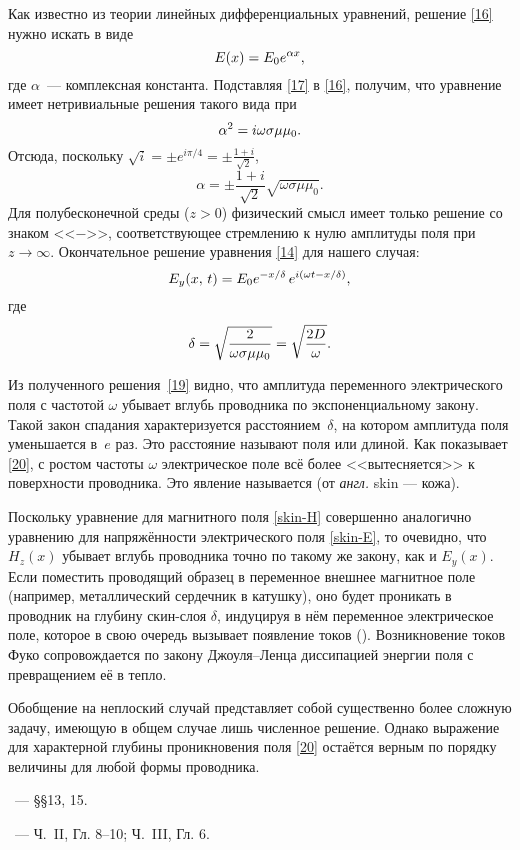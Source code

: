 Как известно из теории линейных дифференциальных уравнений, решение
\eqref{16} нужно искать в виде 
\begin{equation} \eqmark{17}
E(x)=E_0 e^{\alpha x},
\end{equation}
где $\alpha$~--- комплексная константа. 
Подставляя \eqref{17} в \eqref{16}, получим, что уравнение имеет
нетривиальные решения такого вида при
\begin{equation} \eqmark{18}
\alpha^2=i\omega\sigma\mu\mu_0.
\end{equation}
Отсюда, поскольку $\sqrt{i} = \pm e^{i\pi/4}  = \pm \frac{1+i}{\sqrt{2}}$,
\begin{equation*}
\alpha=\pm\frac{1+i}{\sqrt{2}}\sqrt{\omega\sigma\mu\mu_0}.
\end{equation*}
Для полубесконечной среды ($z>0$) физический смысл имеет только решение
со знаком <<$-$>>, соответствующее стремлению к нулю амплитуды поля 
при $z\to \infty$. 
Окончательное решение уравнения \eqref{14} для нашего случая:
\begin{equation} \eqmark{19}
E_y(x,\,t)=E_0e^{-x/\delta}\,e^{i(\omega t- x/\delta)},
\end{equation}
где
\begin{equation} \eqmark{20}
\delta = \sqrt{\frac{2}{\omega\sigma\mu\mu_0}} = \sqrt{\frac{2D}{\omega}}.
\end{equation}

Из полученного решения~\eqref{19} видно, что амплитуда переменного
электрического поля с частотой $\omega$ убывает вглубь
проводника по экспоненциальному закону. 
Такой закон спадания характеризуется расстоянием~$\delta$, 
на котором амплитуда поля уменьшается в~$e$ раз. 
Это расстояние называют  поля
или  длиной.
Как показывает \eqref{20}, 
с ростом частоты $\omega$ электрическое поле всё более <<вытесняется>> 
к поверхности проводника. Это явление называется 
(от \emph{англ.} skin --- кожа). 

Поскольку уравнение для магнитного поля \eqref{skin-H} совершенно аналогично
уравнению для напряжённости электрического поля \eqref{skin-E}, то очевидно, 
что $H_z(x)$ убывает вглубь проводника точно по такому же закону, 
как и $E_y(x)$. Если поместить проводящий образец в переменное внешнее магнитное поле
(например, металлический сердечник в катушку),
оно будет проникать в проводник на глубину скин-слоя $\delta$, индуцируя в нём
переменное электрическое поле, которое в свою очередь 
вызывает появление токов (). Возникновение токов Фуко
сопровождается по закону Джоуля--Ленца диссипацией энергии поля с превращением
её в тепло.

Обобщение на неплоский случай представляет собой
существенно более сложную задачу, имеющую в общем случае лишь численное решение.
Однако выражение для характерной глубины проникновения поля \eqref{20} 
остаётся верным по порядку величины для любой формы проводника.


\begin{lab:literature}
    \item \Kirichenko~--- \S\S 13, 15.
    \item \KingLokOlh~--- Ч.~II, Гл. 8--10; Ч.~III, Гл. 6.
\end{lab:literature}
    
